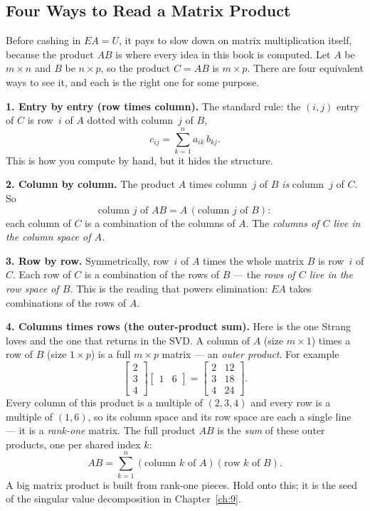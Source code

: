 \subsection{Four Ways to Read a Matrix Product}
\label{sec:ch2-mult}

Before cashing in $EA=U$, it pays to slow down on matrix multiplication itself, because the product $AB$ is where every idea in this book is computed. Let $A$ be $m\times n$ and $B$ be $n\times p$, so the product $C=AB$ is $m\times p$. There are four equivalent ways to see it, and each is the right one for some purpose.

\textbf{1. Entry by entry (row times column).} The standard rule: the $(i,j)$ entry of $C$ is row~$i$ of $A$ dotted with column~$j$ of $B$,
\[
c_{ij}=\sum_{k=1}^{n} a_{ik}\,b_{kj}.
\]
This is how you compute by hand, but it hides the structure.

\textbf{2. Column by column.} The product $A$ times column~$j$ of $B$ \emph{is} column~$j$ of $C$. So
\[
\text{column } j \text{ of } AB = A\,(\text{column } j \text{ of } B):
\]
each column of $C$ is a combination of the columns of $A$. The \emph{columns of $C$ live in the column space of $A$.}

\textbf{3. Row by row.} Symmetrically, row~$i$ of $A$ times the whole matrix $B$ is row~$i$ of $C$. Each row of $C$ is a combination of the rows of $B$ --- the \emph{rows of $C$ live in the row space of $B$.} This is the reading that powers elimination: $EA$ takes combinations of the rows of $A$.

\textbf{4. Columns times rows (the outer-product sum).} Here is the one Strang loves and the one that returns in the SVD. A column of $A$ (size $m\times 1$) times a row of $B$ (size $1\times p$) is a full $m\times p$ matrix --- an \emph{outer product}. For example
\[
\begin{bmatrix} 2\\ 3\\ 4\end{bmatrix}
\begin{bmatrix} 1 & 6\end{bmatrix}
=\begin{bmatrix} 2 & 12\\ 3 & 18\\ 4 & 24\end{bmatrix}.
\]
Every column of this product is a multiple of $(2,3,4)$ and every row is a multiple of $(1,6)$, so its column space and its row space are each a single line --- it is a \emph{rank-one} matrix. The full product $AB$ is the \emph{sum} of these outer products, one per shared index $k$:
\[
AB=\sum_{k=1}^{n} (\text{column } k \text{ of } A)(\text{row } k \text{ of } B).
\]
A big matrix product is built from rank-one pieces. Hold onto this; it is the seed of the singular value decomposition in Chapter~\ref{ch:9}.

